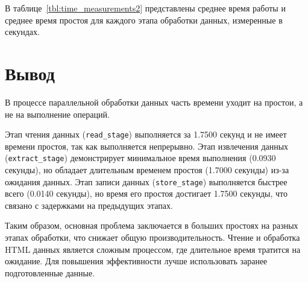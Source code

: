 В таблице~\ref{tbl:time_measurements2} представлены среднее время работы и среднее время простоя для каждого этапа обработки данных, измеренные в секундах.
\begin{table}[h]
    \begin{center}
        \begin{threeparttable}
        \captionsetup{justification=raggedright,singlelinecheck=off}
            \caption{Среднее время работы и простоя на каждом этапе обработки данных (в секундах)}
            \label{tbl:time_measurements2}
        \end{threeparttable}
    \end{center}
\end{table}

\section*{Вывод}  
В процессе параллельной обработки данных часть времени уходит на простои, а не на выполнение операций.  

Этап чтения данных (\texttt{read\_stage}) выполняется за 1.7500 секунд и не имеет времени простоя, так как выполняется непрерывно. Этап извлечения данных (\texttt{extract\_stage}) демонстрирует минимальное время выполнения (0.0930 секунды), но обладает длительным временем простоя (1.7000 секунды) из-за ожидания данных. Этап записи данных (\texttt{store\_stage}) выполняется быстрее всего (0.0140 секунды), но время его простоя достигает 1.7500 секунды, что связано с задержками на предыдущих этапах.  

Таким образом, основная проблема заключается в больших простоях на разных этапах обработки, что снижает общую производительность.  Чтение и обработка HTML данных является сложным процессом, где длительное время тратится на ожидание. Для повышения эффективности лучше использовать заранее подготовленные данные.

